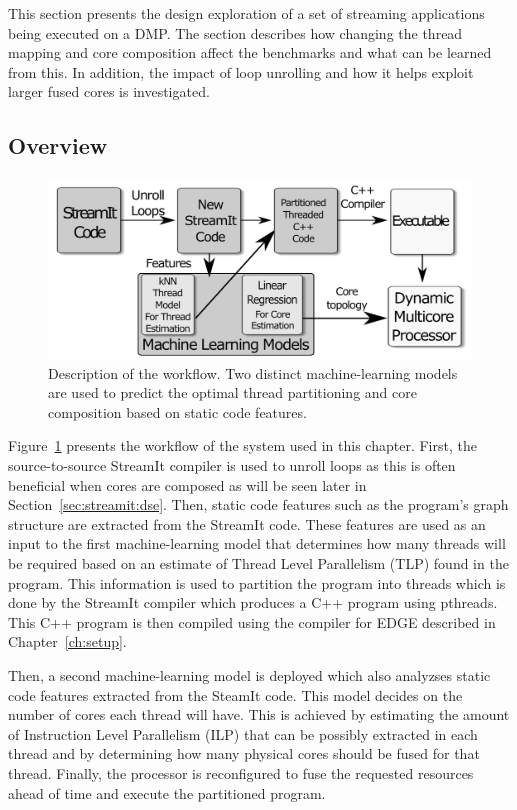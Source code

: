This section presents the design exploration of a set of streaming applications being executed on a DMP.
The section describes how changing the thread mapping and core composition affect the benchmarks and what can be learned from this.
In addition, the impact of loop unrolling and how it helps exploit larger fused cores is investigated.

\subsection{Overview}

\begin{figure}
    \centering
    \includegraphics[width=1\textwidth]{streamit-paper/graphics/explanation.pdf}
    \caption{Description of the workflow.
    Two distinct machine-learning models are used to predict the optimal thread partitioning and core composition based on static code features.}
    \label{fig:overview}
\end{figure}

Figure~\ref{fig:overview} presents the workflow of the system used in this chapter.
First, the source-to-source StreamIt compiler is used to unroll loops as this is often beneficial when cores are composed as will be seen later in Section~\ref{sec:streamit:dse}.
Then, static code features such as the program's graph structure are extracted from the StreamIt code.
These features are used as an input to the first machine-learning model that determines how many threads will be required based on an estimate of Thread Level Parallelism (TLP) found in the program.
This information is used to partition the program into threads which is done by the StreamIt compiler which produces a C++ program using pthreads.
This C++ program is then compiled using the compiler for EDGE described in Chapter~\ref{ch:setup}.

Then, a second machine-learning model is deployed which also analyzses static code features extracted from the SteamIt code.
This model decides on the number of cores each thread will have.
This is achieved by estimating the amount of Instruction Level Parallelism (ILP) that can be possibly extracted in each thread and by determining how many physical cores should be fused for that thread.
Finally, the processor is reconfigured to fuse the requested resources ahead of time and execute the partitioned program.

